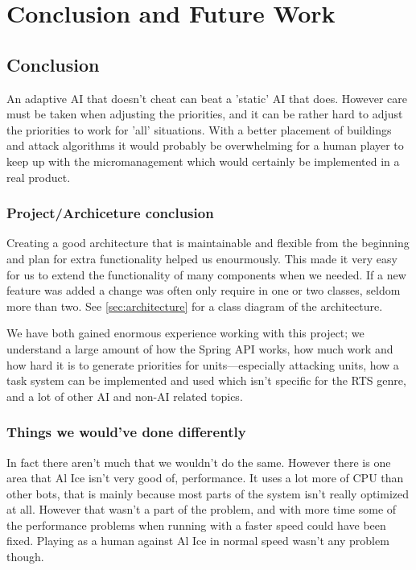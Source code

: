 \chapter{Conclusion and Future Work}
\section{Conclusion}
An adaptive AI that doesn't cheat can beat a 'static' AI that does. However care must be taken when
adjusting the priorities, and it can be rather hard to adjust the priorities to work for 'all'
situations. With a better placement of buildings and attack algorithms it would probably be
overwhelming for a human player to keep up with the micromanagement which would certainly be
implemented in a real product.

\subsection{Project/Archiceture conclusion}
Creating a good architecture that is maintainable and
flexible from the beginning and plan for extra functionality helped us
enourmously. This made it very easy for us to extend the functionality of
many components when we needed. If a new feature was added a change was often
only require in one or two classes, seldom more than two. See
\ref{sec:architecture} for a class diagram of the architecture.

We have both gained enormous experience working with this project; we understand a large amount of
how the Spring API works, how much work and how hard it is to generate priorities for
units---especially attacking units, how a task system can be implemented and used which isn't
specific for the RTS genre, and a lot of other AI and non-AI related topics.

\subsection{Things we would've done differently}
In fact there aren't much that we wouldn't do the same. However there is one area that Al Ice isn't
very good of, performance. It uses a lot more of CPU than other bots, that is mainly because most
parts of the system isn't really optimized at all. However that wasn't a part of the
problem, and with more time some of the performance problems when running with a faster
speed could have been fixed. Playing as a human against Al Ice in normal speed wasn't any problem though.



